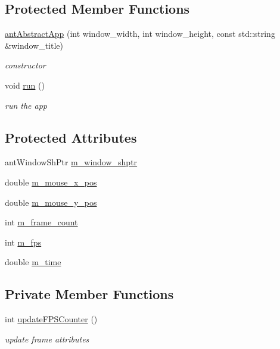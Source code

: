 \subsection*{Protected Member Functions}
\begin{DoxyCompactItemize}
\item 
\hyperlink{classant_abstract_app_ac1cbc2a3609ae4cde6ed6fc41af85d96}{ant\+Abstract\+App} (int window\+\_\+width, int window\+\_\+height, const std\+::string \&window\+\_\+title)
\begin{DoxyCompactList}\small\item\em constructor \end{DoxyCompactList}\item 
void \hyperlink{classant_abstract_app_a8fc3c5dcc8feb8ed8039afe41b1c63eb}{run} ()
\begin{DoxyCompactList}\small\item\em run the app \end{DoxyCompactList}\end{DoxyCompactItemize}
\subsection*{Protected Attributes}
\begin{DoxyCompactItemize}
\item 
ant\+Window\+Sh\+Ptr \hyperlink{classant_abstract_app_a2da8dc7071eb8f76ffe3fae6329439b2}{m\+\_\+window\+\_\+shptr}
\item 
double \hyperlink{classant_abstract_app_a3dd118d6793e653f1207abc4b498608d}{m\+\_\+mouse\+\_\+x\+\_\+pos}
\item 
double \hyperlink{classant_abstract_app_a44c5d57e580b3e68d076f638aa866bef}{m\+\_\+mouse\+\_\+y\+\_\+pos}
\item 
int \hyperlink{classant_abstract_app_a3346b67b4fe4b9627d9dbb064a08669b}{m\+\_\+frame\+\_\+count}
\item 
int \hyperlink{classant_abstract_app_a9d6e7846652cca2333831a19b1a4dad8}{m\+\_\+fps}
\item 
double \hyperlink{classant_abstract_app_a477dd78269fac0a6c2b20aa7fac41426}{m\+\_\+time}
\end{DoxyCompactItemize}
\subsection*{Private Member Functions}
\begin{DoxyCompactItemize}
\item 
int \hyperlink{classant_abstract_app_a205cc1e54945a8d88b270b0394958b3e}{update\+F\+P\+S\+Counter} ()
\begin{DoxyCompactList}\small\item\em update frame attributes \end{DoxyCompactList}\end{DoxyCompactItemize}


